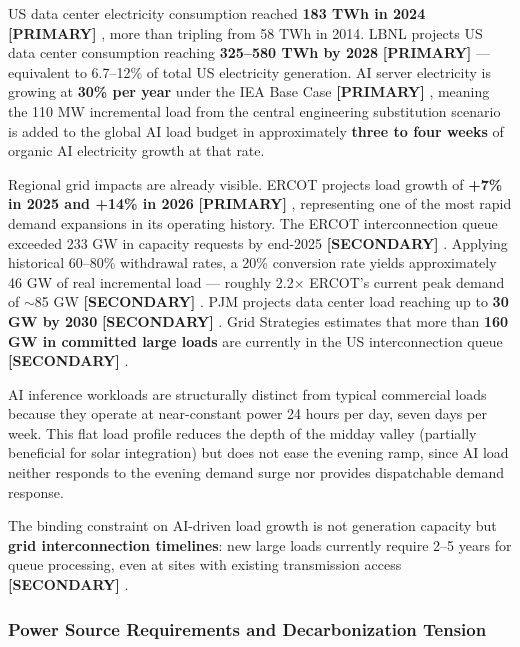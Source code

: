 \documentclass{article}
\newcommand{\PRIMARY}{\textbf{[PRIMARY]}}
\newcommand{\SECONDARY}{\textbf{[SECONDARY]}}
\begin{document}
US data center electricity consumption reached \textbf{183 TWh in 2024} \PRIMARY{} \citep{lbnl2024datacenter}, more
than tripling from 58 TWh in 2014. LBNL projects US data center consumption reaching
\textbf{325--580 TWh by 2028} \PRIMARY{} \citep{lbnl2024datacenter} --- equivalent to 6.7--12\% of total US
electricity generation. AI server electricity is growing at \textbf{30\% per year} under the
IEA Base Case \PRIMARY{} \citep{iea2024energy}, meaning the 110 MW incremental load from the central
engineering substitution scenario is added to the global AI load budget in approximately
\textbf{three to four weeks} of organic AI electricity growth at that rate.

Regional grid impacts are already visible. ERCOT projects load growth of \textbf{+7\% in
2025 and +14\% in 2026} \PRIMARY{} \citep{ercot2025forecast}, representing one of the most rapid demand
expansions in its operating history. The ERCOT interconnection queue exceeded 233 GW in
capacity requests by end-2025 \SECONDARY{} \citep{ercot2025forecast}. Applying historical 60--80\%
withdrawal rates, a 20\% conversion rate yields approximately 46 GW of real incremental
load --- roughly 2.2$\times$ ERCOT's current peak demand of $\sim$85 GW
\SECONDARY{} \citep{ercot2025forecast}. PJM projects data center load reaching up to \textbf{30 GW by
2030} \SECONDARY{} \citep{energyedge2025pjm}. Grid Strategies estimates that more than \textbf{160 GW
in committed large loads} are currently in the US interconnection queue \SECONDARY{} \citep{gridstrategies2025load}.

AI inference workloads are structurally distinct from typical commercial loads because they
operate at near-constant power 24 hours per day, seven days per week. This flat load profile
reduces the depth of the midday valley (partially beneficial for solar integration) but does not
ease the evening ramp, since AI load neither responds to the evening demand surge nor provides
dispatchable demand response.

The binding constraint on AI-driven load growth is not generation capacity but
\textbf{grid interconnection timelines}: new large loads currently require 2--5 years for
queue processing, even at sites with existing transmission access \SECONDARY{}
\citep{gridstrategies2025load}.

\subsubsection{Power Source Requirements and Decarbonization Tension}
\end{document}
